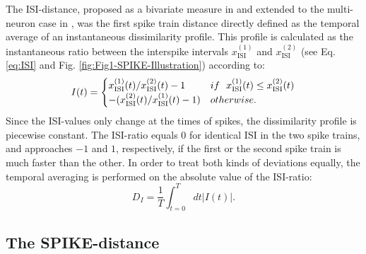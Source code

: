 \documentclass[10pt,twocolumn]{elsart5p}
\begin{document}
The ISI-distance, proposed as a bivariate measure in \citep{Kreuz07c} and extended to the multi-neuron case in \citep{Kreuz09}, was the first spike train distance directly defined as the temporal average of an instantaneous dissimilarity profile. This profile is calculated as the instantaneous ratio between the interspike intervals $x_{\mathrm {ISI}}^{(1)}$ and $x_{\mathrm {ISI}}^{(2)}$ (see Eq. \ref{eq:ISI} and Fig. \ref{fig:Fig1-SPIKE-Illustration}) according to:
%
\begin{equation} \label{eq:ISI-Ratio}
    I (t) = \begin{cases}
           x_{\mathrm {ISI}}^{(1)} (t) / x_{\mathrm {ISI}}^{(2)} (t) - 1 & {\rm if} ~~ x_{\mathrm {ISI}}^{(1)} (t) \leq x_{\mathrm {ISI}}^{(2)} (t) \cr
                      - (x_{\mathrm {ISI}}^{(2)} (t) / x_{\mathrm {ISI}}^{(1)} (t) -1)     & {\rm otherwise}.
                  \end{cases}
\end{equation}
%
Since the ISI-values only change at the times of spikes, the dissimilarity profile is piecewise constant. The ISI-ratio equals $0$ for identical ISI in the two spike trains, and approaches $-1$ and $1$, respectively, if the first or the second spike train is much faster than the other. In order to treat both kinds of deviations equally, the temporal averaging is performed on the absolute value of the ISI-ratio:
%
\begin{equation} \label{eq:Temporal-Average}
    D_I = \frac{1}{T} \int_{t=0}^T dt |I (t)|.
\end{equation}


\subsection{\label{ss:SPIKE-Distance} The SPIKE-distance}
\end{document}

